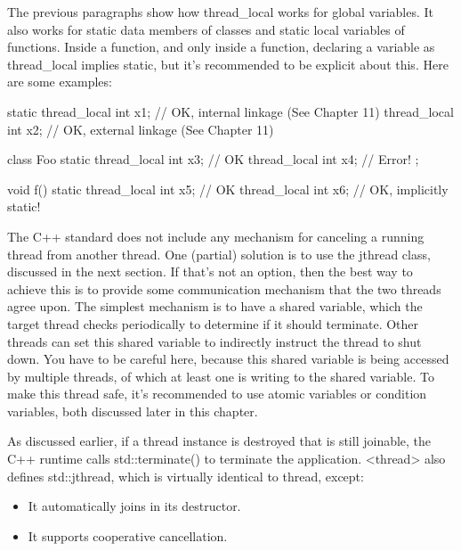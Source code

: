 The previous paragraphs show how thread\_local works for global variables. It also works for static data members of classes and static local variables of functions. Inside a function, and only inside a function, declaring a variable as thread\_local implies static, but it’s recommended to be explicit about this. Here are some examples:

\begin{cpp}
static thread_local int x1; // OK, internal linkage (See Chapter 11)
thread_local int x2; // OK, external linkage (See Chapter 11)

class Foo
{
    static thread_local int x3; // OK
    thread_local int x4; // Error!
};

void f()
{
    static thread_local int x5; // OK
    thread_local int x6; // OK, implicitly static!
}
\end{cpp}


The C++ standard does not include any mechanism for canceling a running thread from another thread. One (partial) solution is to use the jthread class, discussed in the next section. If that’s not an option, then the best way to achieve this is to provide some communication mechanism that the two threads agree upon. The simplest mechanism is to have a shared variable, which the target thread checks periodically to determine if it should terminate. Other threads can set this shared variable to indirectly instruct the thread to shut down. You have to be careful here, because this shared variable is being accessed by multiple threads, of which at least one is writing to the shared variable. To make this thread safe, it’s recommended to use atomic variables or condition variables, both discussed later in this chapter.


As discussed earlier, if a thread instance is destroyed that is still joinable, the C++ runtime calls std::terminate() to terminate the application. <thread> also defines std::jthread, which is virtually identical to thread, except:

\begin{itemize}
\item
It automatically joins in its destructor.

\item
 It supports cooperative cancellation.
\end{itemize}

